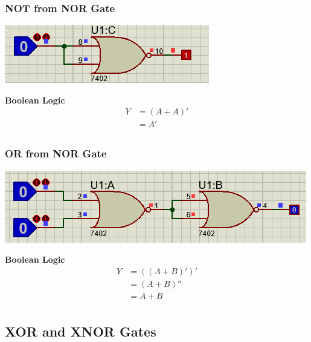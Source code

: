 \documentclass[a4paper, 12pt]{article}
\begin{document}
\subsubsection{NOT from NOR Gate}
\begin{center}
  \includegraphics[scale=0.75]{nor-not}
\end{center}
\textbf{Boolean Logic}
\begin{equation}
\begin{split}
  Y & = (A+A)'  \\
    & = A'  \\
\end{split}
\end{equation}

\subsubsection{OR from NOR Gate}
\begin{center}
  \includegraphics[scale=0.75]{nor-or}
\end{center}
\textbf{Boolean Logic}
\begin{equation} 
\begin{split}
  Y & = ((A+B)')' \\
    & = (A+B)'' \\
    & = A+B\\
\end{split}
\end{equation}

\pagebreak
\subsection{XOR and XNOR Gates}
\end{document}
